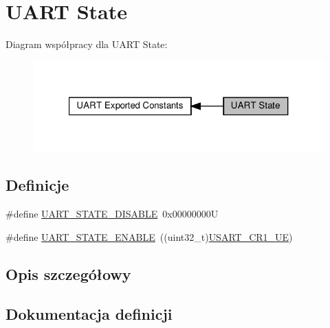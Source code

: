 \hypertarget{group___u_a_r_t___state}{}\section{U\+A\+RT State}
\label{group___u_a_r_t___state}
Diagram współpracy dla U\+A\+RT State\+:\nopagebreak
\begin{figure}[H]
\begin{center}
\leavevmode
\includegraphics[width=321pt]{group___u_a_r_t___state}
\end{center}
\end{figure}
\subsection*{Definicje}
\begin{DoxyCompactItemize}
\item 
\#define \hyperlink{group___u_a_r_t___state_gaf32492459be708981ebc5615194cdae9}{U\+A\+R\+T\+\_\+\+S\+T\+A\+T\+E\+\_\+\+D\+I\+S\+A\+B\+LE}~0x00000000U
\item 
\#define \hyperlink{group___u_a_r_t___state_gab6b470dccef2a518a45554b171acff5b}{U\+A\+R\+T\+\_\+\+S\+T\+A\+T\+E\+\_\+\+E\+N\+A\+B\+LE}~((uint32\+\_\+t)\hyperlink{group___peripheral___registers___bits___definition_ga2bb650676aaae4a5203f372d497d5947}{U\+S\+A\+R\+T\+\_\+\+C\+R1\+\_\+\+UE})
\end{DoxyCompactItemize}


\subsection{Opis szczegółowy}


\subsection{Dokumentacja definicji}
\mbox{\label{group___u_a_r_t___state_gaf32492459be708981ebc5615194cdae9}} 
